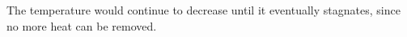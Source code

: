 The temperature would continue to decrease until it eventually stagnates, since no more heat can be removed.